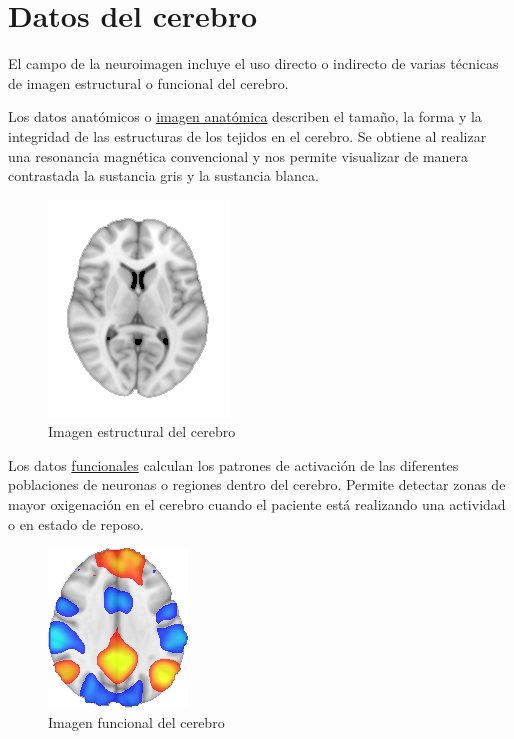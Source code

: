 \section{Datos del cerebro}

El campo de la neuroimagen incluye el uso directo o indirecto de varias técnicas de imagen estructural o funcional del cerebro.

Los datos anatómicos o \hyperref[eda:anat]{imagen anatómica} describen el tamaño, la forma y la integridad de las estructuras de los tejidos en el cerebro. Se obtiene al realizar una resonancia magnética convencional y nos permite visualizar de manera contrastada la sustancia gris y la sustancia blanca.

\begin{figure}[H]
  \centering
    \includegraphics[scale=0.75]{img/anat.png}
  \caption{Imagen estructural del cerebro}\label{eda:anat}
\end{figure}

Los datos \hyperref[eda:func]{funcionales} calculan los patrones de activación de las diferentes poblaciones de neuronas o regiones dentro del cerebro. Permite detectar zonas de mayor oxigenación en el cerebro cuando el paciente está realizando una actividad o en estado de reposo.

\begin{figure}[H]
  \centering
    \includegraphics[scale=0.75]{img/func.png}
  \caption{Imagen funcional del cerebro}\label{eda:func}
\end{figure}
\cite{brainhack,fmri_oxford}

